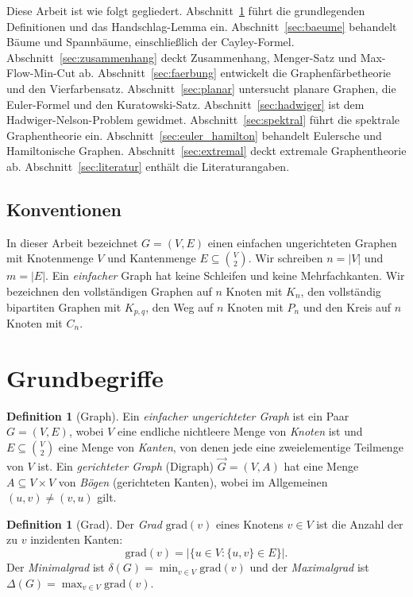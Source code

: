 \documentclass[12pt,a4paper]{amsart}
\theoremstyle{definition}
\newtheorem{definition}[theorem]{Definition}
\theoremstyle{remark}
\newcommand{\grad}{\mathrm{grad}}
\begin{document}
Diese Arbeit ist wie folgt gegliedert. Abschnitt~\ref{sec:grundbegriffe}
führt die grundlegenden Definitionen und das Handschlag-Lemma ein.
Abschnitt~\ref{sec:baeume} behandelt Bäume und Spannbäume, einschließlich
der Cayley-Formel. Abschnitt~\ref{sec:zusammenhang} deckt Zusammenhang,
Menger-Satz und Max-Flow-Min-Cut ab. Abschnitt~\ref{sec:faerbung} entwickelt
die Graphenfärbetheorie und den Vierfarbensatz. Abschnitt~\ref{sec:planar}
untersucht planare Graphen, die Euler-Formel und den Kuratowski-Satz.
Abschnitt~\ref{sec:hadwiger} ist dem Hadwiger-Nelson-Problem gewidmet.
Abschnitt~\ref{sec:spektral} führt die spektrale Graphentheorie ein.
Abschnitt~\ref{sec:euler_hamilton} behandelt Eulersche und Hamiltonische
Graphen. Abschnitt~\ref{sec:extremal} deckt extremale Graphentheorie ab.
Abschnitt~\ref{sec:literatur} enthält die Literaturangaben.

\subsection*{Konventionen}

In dieser Arbeit bezeichnet $G = (V, E)$ einen einfachen ungerichteten Graphen
mit Knotenmenge $V$ und Kantenmenge $E \subseteq \binom{V}{2}$. Wir schreiben
$n = |V|$ und $m = |E|$. Ein \emph{einfacher} Graph hat keine Schleifen und
keine Mehrfachkanten. Wir bezeichnen den vollständigen Graphen auf $n$ Knoten
mit $K_n$, den vollständig bipartiten Graphen mit $K_{p,q}$, den Weg auf $n$
Knoten mit $P_n$ und den Kreis auf $n$ Knoten mit $C_n$.

\section{Grundbegriffe}
\label{sec:grundbegriffe}

\begin{definition}[Graph]
Ein \emph{einfacher ungerichteter Graph} ist ein Paar $G = (V, E)$, wobei
$V$ eine endliche nichtleere Menge von \emph{Knoten} ist und $E \subseteq
\binom{V}{2}$ eine Menge von \emph{Kanten}, von denen jede eine zweielementige
Teilmenge von $V$ ist. Ein \emph{gerichteter Graph} (Digraph) $\vec{G} = (V, A)$
hat eine Menge $A \subseteq V \times V$ von \emph{Bögen} (gerichteten Kanten),
wobei im Allgemeinen $(u, v) \ne (v, u)$ gilt.
\end{definition}

\begin{definition}[Grad]
Der \emph{Grad} $\grad(v)$ eines Knotens $v \in V$ ist die Anzahl der zu $v$
inzidenten Kanten:
\[
  \grad(v) = |\{u \in V : \{u,v\} \in E\}|.
\]
Der \emph{Minimalgrad} ist $\delta(G) = \min_{v \in V} \grad(v)$ und der
\emph{Maximalgrad} ist $\Delta(G) = \max_{v \in V} \grad(v)$.
\end{definition}
\end{document}
